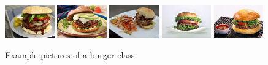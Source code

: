 \documentclass[10pt]{article}
\begin{document}
			\begin{figure}[H]
				\centering
				\includegraphics[width=0.19\textwidth]{images/data/burger/burger28.jpg}
				\includegraphics[width=0.19\textwidth]{images/data/burger/burger77.jpg}
				\includegraphics[width=0.19\textwidth]{images/data/burger/burger89.jpg}
				\includegraphics[width=0.19\textwidth]{images/data/burger/burger162.jpg}
				\includegraphics[width=0.19\textwidth]{images/data/burger/burger449.jpeg}
				\caption[Example pictures of a burger class]{Example pictures of a burger class}
				\label{fig:class_burger}
			\end{figure}
\end{document}
